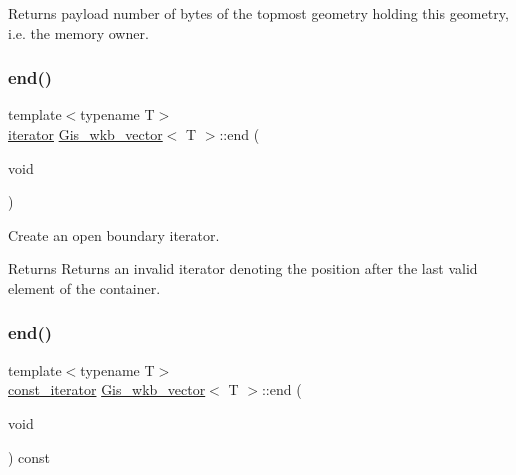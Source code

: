 Returns payload number of bytes of the topmost geometry holding this geometry, i.\+e. the memory owner. \mbox{\label{classGis__wkb__vector_a0aba1035ea56f3a9d5ffe4b73efd6a24}} 
\subsubsection{\texorpdfstring{end()}{end()}\hspace{0.1cm}{\footnotesize\ttfamily [1/2]}}
{\footnotesize\ttfamily template$<$typename T$>$ \\
\mbox{\hyperlink{classGis__wkb__vector__iterator}{iterator}} \mbox{\hyperlink{classGis__wkb__vector}{Gis\+\_\+wkb\+\_\+vector}}$<$ T $>$\+::end (\begin{DoxyParamCaption}\item[{void}]{ }\end{DoxyParamCaption})\hspace{0.3cm}{\ttfamily [inline]}}



Create an open boundary iterator. 

\begin{DoxyReturn}{Returns}
Returns an invalid iterator denoting the position after the last valid element of the container. 
\end{DoxyReturn}
\mbox{\label{classGis__wkb__vector_a02a1d360d52ee8ecf407e320ec53f0ba}} 
\subsubsection{\texorpdfstring{end()}{end()}\hspace{0.1cm}{\footnotesize\ttfamily [2/2]}}
{\footnotesize\ttfamily template$<$typename T$>$ \\
\mbox{\hyperlink{classGis__wkb__vector__const__iterator}{const\+\_\+iterator}} \mbox{\hyperlink{classGis__wkb__vector}{Gis\+\_\+wkb\+\_\+vector}}$<$ T $>$\+::end (\begin{DoxyParamCaption}\item[{void}]{ }\end{DoxyParamCaption}) const\hspace{0.3cm}{\ttfamily [inline]}}



